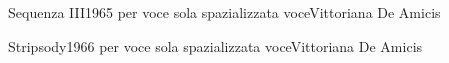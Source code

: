 
{Sequenza III}{1965} %
{per voce sola spazializzata}
{voce}{Vittoriana De Amicis}

{Stripsody}{1966} %
{per voce sola spazializzata}
{voce}{Vittoriana De Amicis}


